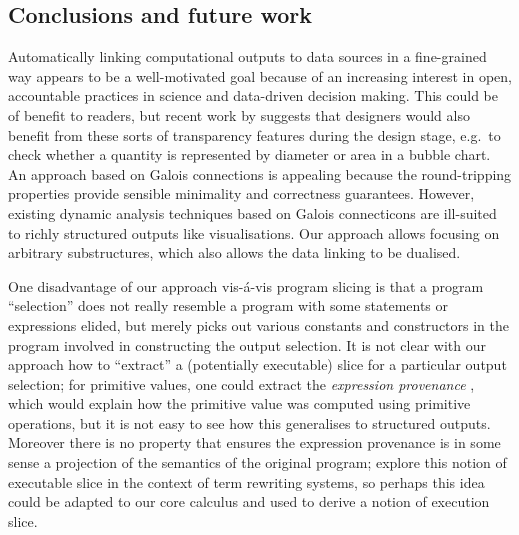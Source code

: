 \subsection{Conclusions and future work}
\label{sec:conclusion:conclusions-and-future-work}

Automatically linking computational outputs to data sources in a fine-grained way appears to be a well-motivated goal because of an increasing interest in open, accountable practices in science and data-driven decision making. This could be of benefit to readers, but recent work by \citet{walny19} suggests that designers would also benefit from these sorts of transparency features during the design stage, e.g.~to check whether a quantity is represented by diameter or area in a bubble chart. An approach based on Galois connections is appealing because the round-tripping properties provide sensible minimality and correctness guarantees. However, existing dynamic analysis techniques based on Galois connecticons are ill-suited to richly structured outputs like visualisations. Our approach allows focusing on arbitrary substructures, which also allows the data linking to be dualised.

One disadvantage of our approach vis-\'a-vis program slicing is that a program ``selection'' does not really resemble a program with some statements or expressions elided, but merely picks out various constants and constructors in the program involved in constructing the output selection. It is not clear with our approach how to ``extract'' a (potentially executable) slice for a particular output selection; for primitive values, one could extract the \emph{expression provenance} \cite{acar12}, which would explain how the primitive value was computed using primitive operations, but it is not easy to see how this generalises to structured outputs. Moreover there is no property that ensures the expression provenance is in some sense a projection of the semantics of the original program; \citet{field98} explore this notion of executable slice in the context of term rewriting systems, so perhaps this idea could be adapted to our core calculus and used to derive a notion of execution slice.
